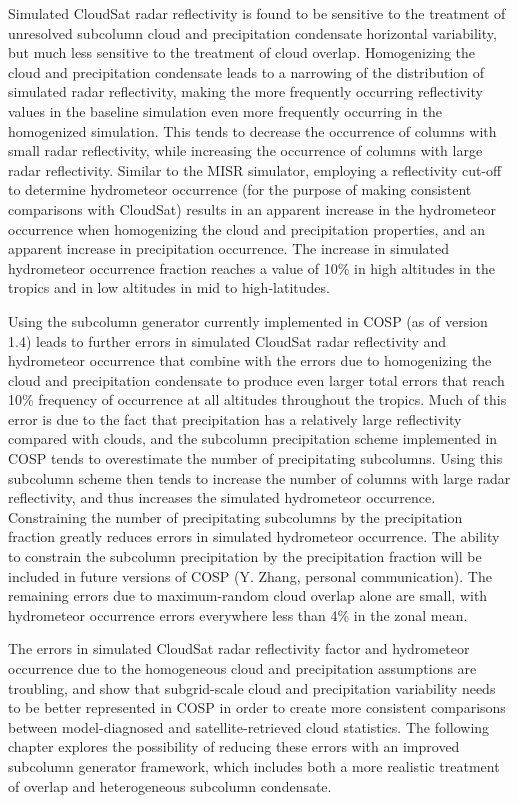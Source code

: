 Simulated CloudSat radar reflectivity is found to be sensitive to the
treatment of unresolved subcolumn cloud and precipitation condensate
horizontal variability, but much less sensitive to the treatment of
cloud overlap. Homogenizing the cloud and precipitation condensate leads
to a narrowing of the distribution of simulated radar reflectivity,
making the more frequently occurring reflectivity values in the baseline
simulation even more frequently occurring in the homogenized simulation.
This tends to decrease the occurrence of columns with small radar
reflectivity, while increasing the occurrence of columns with large
radar reflectivity. Similar to the MISR simulator, employing a
reflectivity cut-off to determine hydrometeor occurrence (for the
purpose of making consistent comparisons with CloudSat) results in an
apparent increase in the hydrometeor occurrence when homogenizing the
cloud and precipitation properties, and an apparent increase in
precipitation occurrence. The increase in simulated hydrometeor
occurrence fraction reaches a value of 10\% in high altitudes in the
tropics and in low altitudes in mid to high-latitudes.

Using the subcolumn generator currently implemented in COSP (as of
version 1.4) leads to further errors in simulated CloudSat radar
reflectivity and hydrometeor occurrence that combine with the errors due
to homogenizing the cloud and precipitation condensate to produce even
larger total errors that reach 10\% frequency of occurrence at all
altitudes throughout the tropics. Much of this error is due to the fact
that precipitation has a relatively large reflectivity compared with
clouds, and the subcolumn precipitation scheme implemented in COSP tends
to overestimate the number of precipitating subcolumns. Using this
subcolumn scheme then tends to increase the number of columns with large
radar reflectivity, and thus increases the simulated hydrometeor
occurrence. Constraining the number of precipitating subcolumns by the
precipitation fraction greatly reduces errors in simulated hydrometeor
occurrence. The ability to constrain the subcolumn precipitation by the
precipitation fraction will be included in future versions of COSP (Y.
Zhang, personal communication). The remaining errors due to
maximum-random cloud overlap alone are small, with hydrometeor
occurrence errors everywhere less than 4\% in the zonal mean.

The errors in simulated CloudSat radar reflectivity factor and
hydrometeor occurrence due to the homogeneous cloud and precipitation
assumptions are troubling, and show that subgrid-scale cloud and
precipitation variability needs to be better represented in COSP in
order to create more consistent comparisons between model-diagnosed and
satellite-retrieved cloud statistics. The following chapter explores the
possibility of reducing these errors with an improved subcolumn
generator framework, which includes both a more realistic treatment of
overlap and heterogeneous subcolumn condensate.
